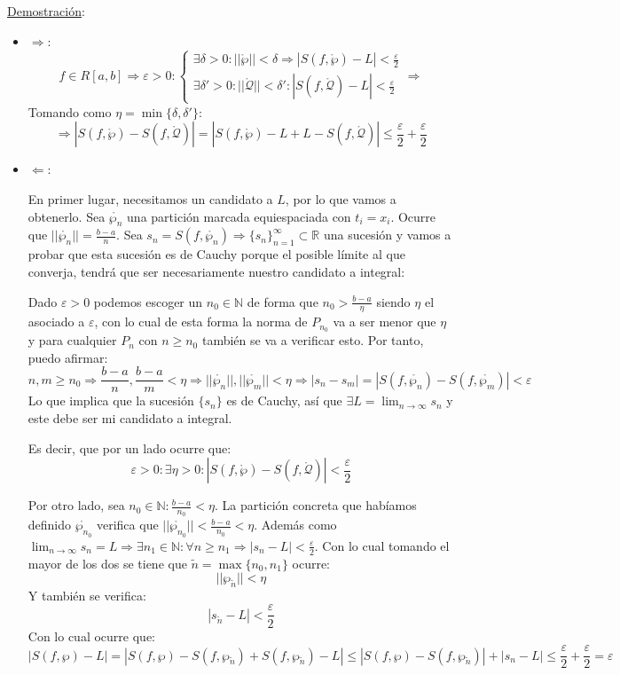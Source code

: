 \documentclass[10pt,a4paper,openright]{book}
\begin{document}
\underline{Demostración}:
\begin{itemize}
\item $\Rightarrow$:
$$f\in R[a,b]\Rightarrow \varepsilon >0 : \begin{cases}\exists \delta >0: ||\mathring{\wp}|| < \delta \Rightarrow |S(f,\mathring{\wp})-L| < \frac{\varepsilon}{2} \\ \exists \delta'>0: ||\mathring{\mathcal{Q}}||< \delta': |S(f, \mathring{\mathcal{Q}})-L|< \frac{\varepsilon}{2} \end{cases}\Rightarrow$$
Tomando como $\eta = \min\{\delta, \delta'\}$:
$$\Rightarrow |S(f,\mathring{\wp})-S(f,\mathring{\mathcal{Q}})|= |S(f,\mathring{\wp})-L+L-S(f,\mathring{\mathcal{Q}})| \leq \frac{\varepsilon}{2}+\frac{\varepsilon}{2}$$

\item $\Leftarrow$:

En primer lugar, necesitamos un candidato a $L$, por lo que vamos a obtenerlo. Sea $\mathring{\wp_n}$ una partición marcada equiespaciada con $t_i=x_i$. Ocurre que $||\mathring{\wp_n}||=\frac{b-a}{n}$. Sea $s_n=S(f,\mathring{\wp_n})\Rightarrow \{s_n\}_{n=1}^\infty \subset \mathbb R$ una sucesión y vamos a probar que esta sucesión es de Cauchy porque el posible límite al que converja, tendrá que ser necesariamente nuestro candidato a integral:

Dado $\varepsilon >0$ podemos escoger un $n_0\in \mathbb N$ de forma que $n_0> \frac{b-a}{\eta}$ siendo $\eta$ el asociado a $\varepsilon$, con lo cual de esta forma la norma de $P_{n_0}$ va a ser menor que $\eta$ y para cualquier $P_{n}$ con $n\geq n_0$ también se va a verificar esto. Por tanto, puedo afirmar:
$$n,m\geq n_0\Rightarrow \frac{b-a}{n}, \frac{b-a}{m}<\eta\Rightarrow ||\mathring{\wp_n}||,||\mathring{\wp_m}||<\eta\Rightarrow |s_n-s_m|=|S(f,\mathring{\wp_n})-S(f,\mathring{\wp_m})|<\varepsilon$$
Lo que implica que la sucesión $\{s_n\}$ es de Cauchy, así que $\exists L = \lim_{n\rightarrow \infty} s_n$ y este debe ser mi candidato a integral.

Es decir, que por un lado ocurre que:
$$\varepsilon > 0 : \exists \eta >0: |S(f,\mathring{\wp})-S(f, \mathring{\mathcal{Q}})|<\frac{\varepsilon}{2}$$

Por otro lado, sea $n_0\in \mathbb N: \frac{b-a}{n_0}<\eta$. La partición concreta que habíamos definido $\mathring{\wp_{n_0}}$ verifica que $||\mathring{\wp_{n_0}}||<\frac{b-a}{n_0}<\eta$. Además como $\lim_{n\rightarrow \infty} s_n = L\Rightarrow \exists n_1\in \mathbb N: \forall n \geq n_1 \Rightarrow  |s_n-L|<\frac{\varepsilon}{2}$. Con lo cual tomando el mayor de los dos se tiene que $\tilde{n}=\max\{n_0,n_1\}$ ocurre:
$$||\wp_{\tilde{n}}||<\eta$$
Y también se verifica:
$$|s_{\tilde{n}}-L|<\frac{\varepsilon}{2}$$
Con lo cual ocurre que:
$$|S(f,\wp)-L|=|S(f,\wp)-S(f,\wp_{\tilde{n}})+S(f, \wp_{\tilde{n}})-L|\leq |S(f,\wp )- S(f,\wp_{\tilde{n}})|+|s_n-L|\leq \frac{\varepsilon}{2} + \frac{\varepsilon}{2} = \varepsilon$$
\end{itemize}
\end{document}
